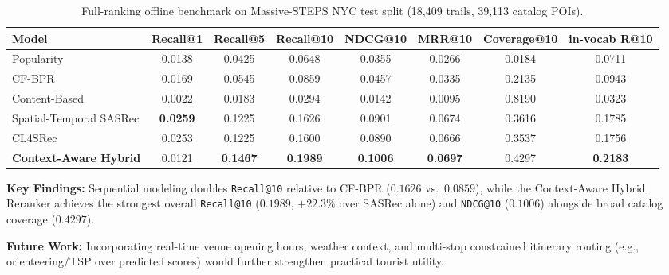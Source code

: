 \documentclass[11pt,a4paper]{article}
\begin{document}
\begin{table}[ht]
\centering
\caption{Full-ranking offline benchmark on Massive-STEPS NYC test split (18,409 trails, 39,113 catalog POIs).}
\label{tab:benchmark}
\begin{tabular}{lccccccc}
\toprule
Model & Recall@1 & Recall@5 & Recall@10 & NDCG@10 & MRR@10 & Coverage@10 & in-vocab R@10 \\
\midrule
Popularity & 0.0138 & 0.0425 & 0.0648 & 0.0355 & 0.0266 & 0.0184 & 0.0711 \\
CF-BPR & 0.0169 & 0.0545 & 0.0859 & 0.0457 & 0.0335 & 0.2135 & 0.0943 \\
Content-Based & 0.0022 & 0.0183 & 0.0294 & 0.0142 & 0.0095 & 0.8190 & 0.0323 \\
Spatial-Temporal SASRec & \textbf{0.0259} & 0.1225 & 0.1626 & 0.0901 & 0.0674 & 0.3616 & 0.1785 \\
CL4SRec & 0.0253 & 0.1225 & 0.1600 & 0.0890 & 0.0666 & 0.3537 & 0.1756 \\
\textbf{Context-Aware Hybrid} & 0.0121 & \textbf{0.1467} & \textbf{0.1989} & \textbf{0.1006} & \textbf{0.0697} & 0.4297 & \textbf{0.2183} \\
\bottomrule
\end{tabular}
\end{table}

\textbf{Key Findings:} Sequential modeling doubles \texttt{Recall@10} relative to CF-BPR ($0.1626$ vs.\ $0.0859$), while the Context-Aware Hybrid Reranker achieves the strongest overall \texttt{Recall@10} ($0.1989$, $+22.3\%$ over SASRec alone) and \texttt{NDCG@10} ($0.1006$) alongside broad catalog coverage ($0.4297$).

\textbf{Future Work:} Incorporating real-time venue opening hours, weather context, and multi-stop constrained itinerary routing (e.g., orienteering/TSP over predicted scores) would further strengthen practical tourist utility.
\end{document}
